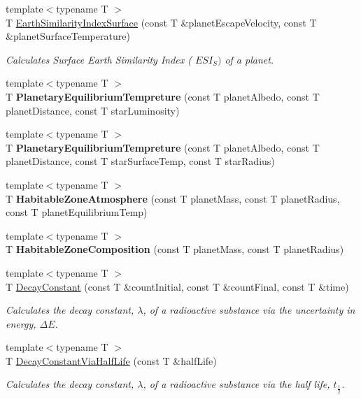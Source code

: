 \begin{DoxyCompactItemize}
{\footnotesize template$<$typename T $>$ }\\T \hyperlink{group___astrophysics_ga1df772b0ed354ca7f7e4a7a4af072325}{Earth\+Similarity\+Index\+Surface} (const T \&planet\+Escape\+Velocity, const T \&planet\+Surface\+Temperature)
\begin{DoxyCompactList}\small\item\em Calculates Surface Earth Similarity Index ( $ESI_S)$ of a planet. \end{DoxyCompactList}\item 
{\footnotesize template$<$typename T $>$ }\\T {\bfseries Planetary\+Equilibrium\+Tempreture} (const T planet\+Albedo, const T planet\+Distance, const T star\+Luminosity)
\item 
{\footnotesize template$<$typename T $>$ }\\T {\bfseries Planetary\+Equilibrium\+Tempreture} (const T planet\+Albedo, const T planet\+Distance, const T star\+Surface\+Temp, const T star\+Radius)
\item 
{\footnotesize template$<$typename T $>$ }\\T {\bfseries Habitable\+Zone\+Atmosphere} (const T planet\+Mass, const T planet\+Radius, const T planet\+Equilibrium\+Temp)
\item 
{\footnotesize template$<$typename T $>$ }\\T {\bfseries Habitable\+Zone\+Composition} (const T planet\+Mass, const T planet\+Radius)
\item 
{\footnotesize template$<$typename T $>$ }\\T \hyperlink{group___atomic_ga904edce5aad441b4a0873b3b1a83c7f2}{Decay\+Constant} (const T \&count\+Initial, const T \&count\+Final, const T \&time)
\begin{DoxyCompactList}\small\item\em Calculates the decay constant, $\lambda$, of a radioactive substance via the uncertainty in energy, $\Delta E$. \end{DoxyCompactList}\item 
{\footnotesize template$<$typename T $>$ }\\T \hyperlink{group___atomic_ga89c04a655d9e24f976399cc8f173b7aa}{Decay\+Constant\+Via\+Half\+Life} (const T \&half\+Life)
\begin{DoxyCompactList}\small\item\em Calculates the decay constant, $\lambda$, of a radioactive substance via the half life, $t_{\frac{1}{2}}$. \end{DoxyCompactList}\item 

\end{DoxyCompactItemize}
